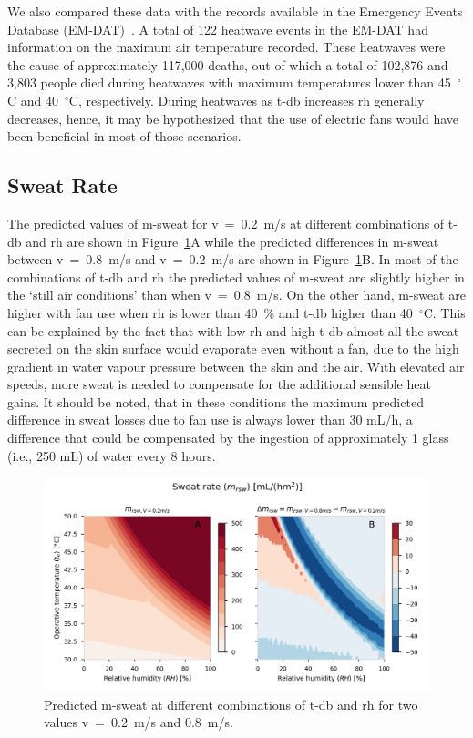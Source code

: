 We also compared these data with the records available in the Emergency Events Database (EM-DAT)~\cite{EMDATThe70:online}.
A total of 122 heatwave events in the EM-DAT had information on the maximum air temperature recorded.
These heatwaves were the cause of approximately 117,000 deaths, out of which a total of 102,876 and 3,803 people died during heatwaves with maximum temperatures lower than 45~$^{\circ}$C and 40~$^{\circ}$C, respectively.
During heatwaves as \ac{t-db} increases \ac{rh} generally decreases, hence, it may be hypothesized that the use of electric fans would have been beneficial in most of those scenarios.

\subsection{Sweat Rate}\label{subsec:sweat-rate}

The predicted values of \ac{m-sweat} for \ac{v}~=~0.2~m/s at different combinations of \ac{t-db} and \ac{rh} are shown in Figure~\ref{fig:sweat_rate}A while the predicted differences in \ac{m-sweat} between \ac{v}~=~0.8~m/s and \ac{v}~=~0.2~m/s are shown in Figure~\ref{fig:sweat_rate}B\@.
In most of the combinations of \ac{t-db} and \ac{rh} the predicted values of \ac{m-sweat} are slightly higher in the `still air conditions' than when \ac{v}~=~0.8~m/s.
On the other hand, \ac{m-sweat} are higher with fan use when \ac{rh} is lower than 40~\% and \ac{t-db} higher than 40~$^{\circ}$C\@.
This can be explained by the fact that with low \ac{rh} and high \ac{t-db} almost all the sweat secreted on the skin surface would evaporate even without a fan, due to the high gradient in water vapour pressure between the skin and the air.
With elevated air speeds, more sweat is needed to compensate for the additional sensible heat gains.
It should be noted, that in these conditions the maximum predicted difference in sweat losses due to fan use is always lower than 30 mL/h, a difference that could be compensated by the ingestion of approximately 1 glass (i.e., 250 mL) of water every 8 hours.

\begin{figure}[hbt!]
    \centering
    \includegraphics[width=\textwidth]{figures/sweat_rate}
    \caption{Predicted \acf{m-sweat} at different combinations of \acf{t-db} and \acf{rh} for two values \acf{v}~=~0.2~m/s and 0.8~m/s.}
    \label{fig:sweat_rate}
\end{figure}